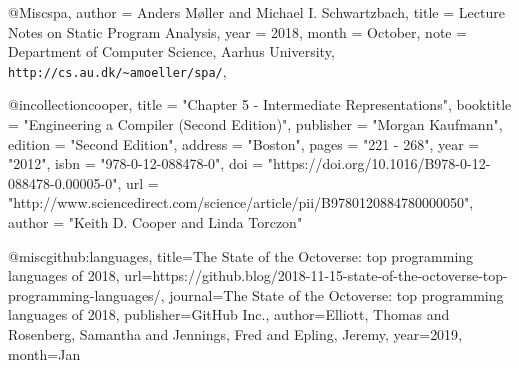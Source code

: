 @Misc{spa,
  author =       {Anders M\o{}ller and Michael I. Schwartzbach},
  title =        {Lecture Notes on Static Program Analysis},
  year =         {2018},
  month =        {October},
  note =         {Department of Computer Science, Aarhus University,
                  \texttt{http://cs.au.dk/\~{}amoeller/spa/}},
}

@incollection{cooper,
title = "Chapter 5 - Intermediate Representations",
booktitle = "Engineering a Compiler (Second Edition)",
publisher = "Morgan Kaufmann",
edition = "Second Edition",
address = "Boston",
pages = "221 - 268",
year = "2012",
isbn = "978-0-12-088478-0",
doi = "https://doi.org/10.1016/B978-0-12-088478-0.00005-0",
url = "http://www.sciencedirect.com/science/article/pii/B9780120884780000050",
author = "Keith D. Cooper and Linda Torczon"
}

@misc{github:languages, title={The State of the Octoverse: top programming languages of 2018}, url={https://github.blog/2018-11-15-state-of-the-octoverse-top-programming-languages/}, journal={The State of the Octoverse: top programming languages of 2018}, publisher={GitHub Inc.}, author={Elliott, Thomas and Rosenberg, Samantha and Jennings, Fred and Epling, Jeremy}, year={2019}, month={Jan}} 
